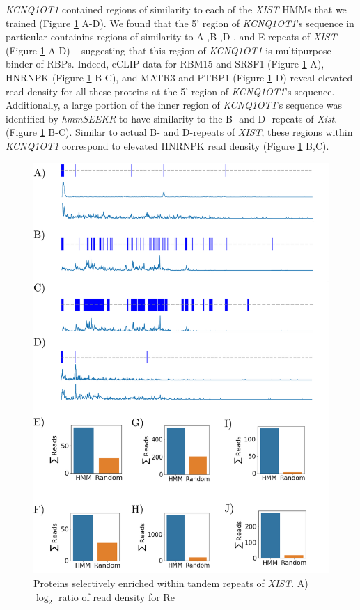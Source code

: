\emph{KCNQ1OT1} contained regions of similarity to each of the \emph{XIST} HMMs that we trained (Figure \ref{fig:kcntracks} A-D). We found that the 5' region of \emph{KCNQ1OT1}'s sequence in particular containins regions of similarity to A-,B-,D-, and E-repeats of \emph{XIST} (Figure \ref{fig:kcntracks} A-D) -- suggesting that this region of \emph{KCNQ1OT1} is multipurpose binder of RBPs. Indeed, eCLIP data for RBM15 and SRSF1 (Figure \ref{fig:kcntracks} A), HNRNPK (Figure \ref{fig:kcntracks} B-C), and MATR3 and PTBP1 (Figure \ref{fig:kcntracks} D) reveal elevated read density for all these proteins at the 5' region of \emph{KCNQ1OT1}'s sequence. Additionally, a large portion of the inner region of \emph{KCNQ1OT1}'s sequence was identified by \emph{hmmSEEKR} to have similarity to the B- and D- repeats of \emph{Xist}. (Figure \ref{fig:kcntracks} B-C). Similar to actual B- and D-repeats of \emph{XIST}, these regions within \emph{KCNQ1OT1} correspond to elevated HNRNPK read density (Figure \ref{fig:kcntracks} B,C). 
\begin{figure}[h!]
\centering
\includegraphics[width=.95\textwidth]{images/kcneclip.pdf}
\caption{Proteins selectively enriched within tandem repeats of \emph{XIST}. A) $\log_2$ ratio of read density for Re}
\label{fig:kcntracks}
\end{figure}

